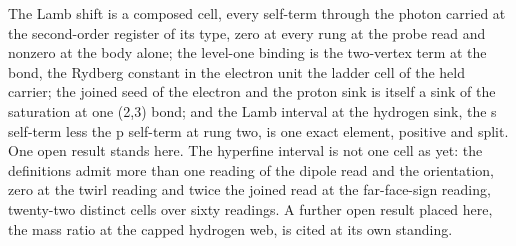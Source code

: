 The Lamb shift is a composed cell, every self-term through the photon carried at the second-order register of its type, zero at every rung at the probe read and nonzero at the body alone; the level-one binding is the two-vertex term at the bond, the Rydberg constant in the electron unit the ladder cell of the held carrier; the joined seed of the electron and the proton sink is itself a sink of the saturation at one (2,3) bond; and the Lamb interval at the hydrogen sink, the s self-term less the p self-term at rung two, is one exact element, positive and split.
One open result stands here. The hyperfine interval is not one cell as yet: the definitions admit more than one reading of the dipole read and the orientation, zero at the twirl reading and twice the joined read at the far-face-sign reading, twenty-two distinct cells over sixty readings. A further open result placed here, the mass ratio at the capped hydrogen web, is cited at its own standing.
